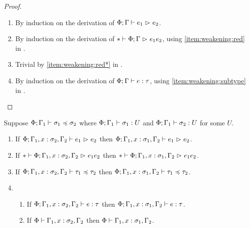 \begin{proof} \hfill
\begin{enumerate}[noitemsep]
  \item By induction on the derivation of $\Phi; \Gamma \mathrel{\vdash} e_1 \mathrel{\rhd}_{} e_2$.
  \item By induction on the derivation of $* \mathrel{\vdash} \Phi; \Gamma \mathrel{\rhd}_{} e_1{e_2}$,
    using \cref{item:weakening:red} in .
  \item Trivial by \cref{item:weakening:red*} in .
  \item By induction on the derivation of $\Phi; \Gamma \mathrel{\vdash} e \mathrel{:} \tau$,
    using \cref{item:weakening:subtype} in . \qedhere
\end{enumerate}
\end{proof}

\begin{lemma} \label{lem:replacement-subtyping}
Suppose $\Phi; \Gamma_1 \mathrel{\vdash} \sigma_1 \mathrel{\preccurlyeq} \sigma_2$ where
$\Phi; \Gamma_1 \mathrel{\vdash} \sigma_1 \mathrel{:} U$ and $\Phi; \Gamma_1 \mathrel{\vdash} \sigma_2 \mathrel{:} U$
for some $U$.
\begin{enumerate}[noitemsep]
  \item \label{item:replacement-subtyping:red}
    If $\Phi; \Gamma_1, x \mathrel{:} \sigma_2, \Gamma_2 \mathrel{\vdash} e_1 \mathrel{\rhd}_{} e_2$
    then $\Phi; \Gamma_1, x \mathrel{:} \sigma_1, \Gamma_2 \mathrel{\vdash} e_1 \mathrel{\rhd}_{} e_2$.
  \item \label{item:replacement-subtyping:red*}
    If $* \mathrel{\vdash} \Phi; \Gamma_1, x \mathrel{:} \sigma_2, \Gamma_2 \mathrel{\rhd}_{} e_1{e_2}$
    then $* \mathrel{\vdash} \Phi; \Gamma_1, x \mathrel{:} \sigma_1, \Gamma_2 \mathrel{\rhd}_{} e_1{e_2}$.
  \item \label{item:replacement-subtyping:subtyping}
    If $\Phi; \Gamma_1, x \mathrel{:} \sigma_2, \Gamma_2 \mathrel{\vdash} \tau_1 \mathrel{\preccurlyeq} \tau_2$
    then $\Phi; \Gamma_1, x \mathrel{:} \sigma_1, \Gamma_2 \mathrel{\vdash} \tau_1 \mathrel{\preccurlyeq} \tau_2$.
  \item
    \begin{enumerate}[noitemsep]
      \item \label{item:replacement-subtyping:typing} If $\Phi; \Gamma_1, x \mathrel{:} \sigma_2, \Gamma_2 \mathrel{\vdash} e \mathrel{:} \tau$
        then $\Phi; \Gamma_1, x \mathrel{:} \sigma_1, \Gamma_2 \mathrel{\vdash} e \mathrel{:} \tau$.
      \item \label{item:replacement-subtyping:wf} If $\Phi \mathrel{\vdash} \Gamma_1, x \mathrel{:} \sigma_2, \Gamma_2$
        then $\Phi \mathrel{\vdash} \Gamma_1, x \mathrel{:} \sigma_1, \Gamma_2$.
    \end{enumerate}
\end{enumerate}
\end{lemma}


